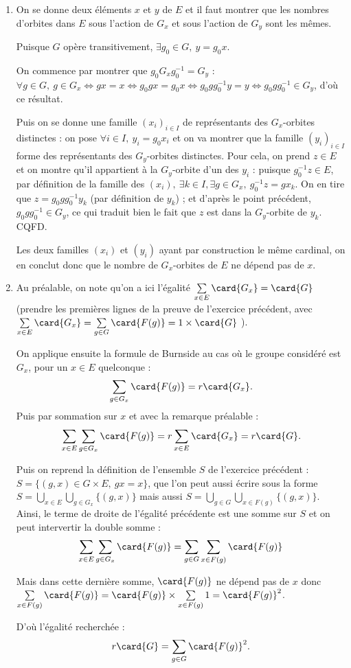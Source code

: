 
\begin{enumerate}
  \item On se donne deux éléments $x$ et $y$ de $E$ et il faut montrer que les nombres d'orbites dans $E$ sous l'action de $G_x$ et sous l'action de $G_y$ sont les mêmes.

  Puisque $G$ opère transitivement, $\exists g_0 \in G,~ y = g_0 x$.

  On commence par montrer que $g_0 G_x g_0^{-1} = G_y$ : $\forall g\in G,~ g\in G_x \iff gx = x \iff g_0 g x = g_0 x \iff g_0 g g_0^{-1} y = y \iff  g_0 g g_0^{-1} \in G_y$, d'où ce résultat.

  Puis on se donne une famille $(x_i)_{i\in I}$ de représentants des $G_x$-orbites distinctes : on pose $\forall i\in I,~ y_i = g_0x_i$ et on va montrer que la famille $(y_i)_{i\in I}$ forme des représentants des $G_y$-orbites distinctes. Pour cela, on prend $z\in E$ et on montre qu'il appartient à la $G_y$-orbite d'un des $y_i$ : puisque $g_0^{-1}z \in E$, par définition de la famille des $(x_i),~ \exists k\in I,\exists g\in G_x,~ g_0^{-1}z = g x_k$. On en tire que $z = g_0 g g_0^{-1} y_k$ (par définition de $y_k$) ; et d'après le point précédent, $g_0 g g_0^{-1} \in G_y$, ce qui traduit bien le fait que $z$ est dans la $G_y$-orbite de $y_k$. CQFD.

  Les deux familles $(x_i)$ et $(y_i)$ ayant par construction le même cardinal, on en conclut donc que le nombre de $G_x$-orbites de $E$ ne dépend pas de $x$.

  \item Au préalable, on note qu'on a ici l'égalité $\sum\limits_{x\in E} \card{G_x} = \card{G}$ (prendre les premières lignes de la preuve de l'exercice précédent, avec $\sum\limits_{x\in E} \card{G_x} = \sum\limits_{g\in G} \card{F(g)} = 1\times \card{G}$ ).

  On applique ensuite la formule de Burnside au cas où le groupe considéré est $G_x$, pour un $x\in E$ quelconque :
       \[
          \sum_{g\in G_x} \card{F(g)} = r \card{G_x}.
        \]
Puis par sommation sur $x$ et avec la remarque préalable :
     \[
          \sum_{x\in E} \sum_{g\in G_x} \card{F(g)} = r \sum_{x\in E} \card{G_x} = r \card{G}.
        \]

Puis on reprend la définition de l'ensemble $S$ de l'exercice précédent : $S = \{(g,x)\in G\times E,~ gx = x\}$, que l'on peut aussi écrire sous la forme $S = \bigcup\limits_{x\in E} \bigcup\limits_{g\in G_x} \{(g,x) \}$ mais aussi $S = \bigcup\limits_{g\in G} \bigcup\limits_{x\in F(g)} \{(g,x) \}$. Ainsi, le terme de droite de l'égalité précédente est une somme sur $S$ et on peut intervertir la double somme :
     \[
          \sum_{x\in E} \sum_{g\in G_x} \card{F(g)} =  \sum_{g\in G} \sum_{x\in F(g)} \card{F(g)}
        \]

Mais dans cette dernière somme, $\card{F(g)}$ ne dépend pas de $x$ donc $\sum\limits_{x\in F(g)} \card{F(g)} = \card{F(g)} \times \sum\limits_{x\in F(g)} 1 = \card{F(g)}^2$.

D'où l'égalité recherchée :
       \[
          r \card{G} = \sum_{g\in G} \card{F(g)}^2.
        \]
\end{enumerate}

